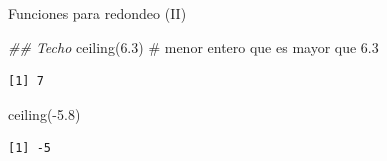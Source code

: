 \documentclass[
  ignorenonframetext,
  aspectratio=169,
  spanish,
]{beamer}
\newenvironment{Shaded}{\begin{snugshade}}{\end{snugshade}}
\newcommand{\CommentTok}[1]{\textcolor[rgb]{0.37,0.37,0.37}{#1}}
\newcommand{\DocumentationTok}[1]{\textcolor[rgb]{0.37,0.37,0.37}{\textit{#1}}}
\newcommand{\FloatTok}[1]{\textcolor[rgb]{0.68,0.00,0.00}{#1}}
\newcommand{\FunctionTok}[1]{\textcolor[rgb]{0.28,0.35,0.67}{#1}}
\newcommand{\NormalTok}[1]{\textcolor[rgb]{0.00,0.23,0.31}{#1}}
\newcommand{\SpecialCharTok}[1]{\textcolor[rgb]{0.37,0.37,0.37}{#1}}
\begin{document}
\begin{frame}[fragile]{Funciones para redondeo (II)}
\label{funciones-para-redondeo-ii}
\begin{Shaded}
\begin{Highlighting}[]
\DocumentationTok{\#\# Techo  }
\FunctionTok{ceiling}\NormalTok{(}\FloatTok{6.3}\NormalTok{) }\CommentTok{\# menor entero que es mayor  que 6.3}
\end{Highlighting}
\end{Shaded}

\begin{verbatim}
[1] 7
\end{verbatim}

\begin{Shaded}
\begin{Highlighting}[]
\FunctionTok{ceiling}\NormalTok{(}\SpecialCharTok{{-}}\FloatTok{5.8}\NormalTok{)}
\end{Highlighting}
\end{Shaded}

\begin{verbatim}
[1] -5
\end{verbatim}
\end{frame}
\end{document}
